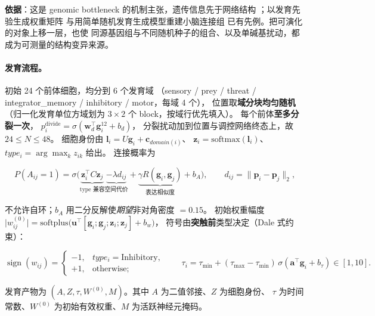 \textbf{依据}：这是 genomic bottleneck 的机制主张，遗传信息先于网络结构
\citep{bib1_zador2019,bib3_shuvaev2024}；以发育先验生成权重矩阵
\citep{bib2_barabasi2023} 与用简单随机发育生成模型重建小脑连接组
\citep{bib4_richter2025} 已有先例。把可演化的对象上移一层，也使
同源基因组与不同随机种子的组合、以及单碱基扰动，都成为可测量的结构变异来源。

\paragraph{发育流程。}初始 24 个前体细胞，均分到 6 个发育域
（sensory / prey / threat / integrator\_memory / inhibitory / motor，每域 4 个），
位置取\textbf{域分块均匀随机}（归一化发育单位方域划为 $3\times2$ 个 block，按域行优先填入）。
每个前体\textbf{至多分裂一次}，
$p_i^{\mathrm{divide}}=\sigma(\mathbf w_d^\top\mathbf g_i^{12}+b_d)$，
分裂扰动加到位置与调控网络终态上，故 $24\le N\le 48$。
细胞身份由 $\mathbf l_i=U\mathbf g_i+\mathbf c_{domain(i)}$、
$\mathbf z_i=\mathrm{softmax}(\mathbf l_i)$、$type_i=\arg\max_k z_{ik}$ 给出。
连接概率为

\begin{equation}\label{method:eq-lij}
P(A_{ij}=1)=\sigma\bigl(\underbrace{\mathbf z_i^\top C\mathbf z_j}_{\text{type 兼容}}
\underbrace{-\lambda d_{ij}}_{\text{空间代价}}
+\underbrace{\gamma R(\mathbf g_i,\mathbf g_j)}_{\text{表达相似度}}
+b_A\bigr),\qquad d_{ij}=\lVert \mathbf p_i-\mathbf p_j\rVert_2,
\end{equation}

不允许自环；$b_A$ 用二分反解使\emph{期望}非对角密度 $=0.15$。
初始权重幅度 $\lvert w^{(0)}_{ij}\rvert=\mathrm{softplus}\bigl(\mathbf u^\top[\mathbf g_i;\mathbf g_j;\mathbf z_i;\mathbf z_j]+b_w\bigr)$，
符号由\textbf{突触前}类型决定（Dale 式约束）：

\begin{equation}\label{method:eq-dale}
\operatorname{sign}(w_{ij})=
\begin{cases}
-1, & type_i=\text{Inhibitory},\\
+1, & \text{otherwise};
\end{cases}
\qquad
\tau_i=\tau_{\min}+(\tau_{\max}-\tau_{\min})\,\sigma(\mathbf a^\top\mathbf g_i+b_\tau)\in[1,10].
\end{equation}

发育产物为 $(A,Z,\tau,W^{(0)},M)$。其中 $A$ 为二值邻接、$Z$ 为细胞身份、
$\tau$ 为时间常数、$W^{(0)}$ 为初始有效权重、$M$ 为活跃神经元掩码。


